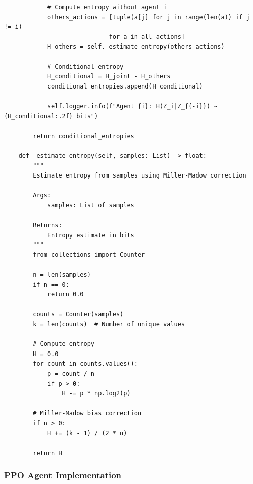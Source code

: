 \documentclass[10pt, letterpaper]{article}
\begin{document}
\begin{lstlisting}
            # Compute entropy without agent i
            others_actions = [tuple(a[j] for j in range(len(a)) if j != i)
                             for a in all_actions]
            H_others = self._estimate_entropy(others_actions)

            # Conditional entropy
            H_conditional = H_joint - H_others
            conditional_entropies.append(H_conditional)

            self.logger.info(f"Agent {i}: H(Z_i|Z_{{-i}}) ~ {H_conditional:.2f} bits")

        return conditional_entropies

    def _estimate_entropy(self, samples: List) -> float:
        """
        Estimate entropy from samples using Miller-Madow correction

        Args:
            samples: List of samples

        Returns:
            Entropy estimate in bits
        """
        from collections import Counter

        n = len(samples)
        if n == 0:
            return 0.0

        counts = Counter(samples)
        k = len(counts)  # Number of unique values

        # Compute entropy
        H = 0.0
        for count in counts.values():
            p = count / n
            if p > 0:
                H -= p * np.log2(p)

        # Miller-Madow bias correction
        if n > 0:
            H += (k - 1) / (2 * n)

        return H
\end{lstlisting}

\subsubsection{PPO Agent Implementation}
\end{document}
